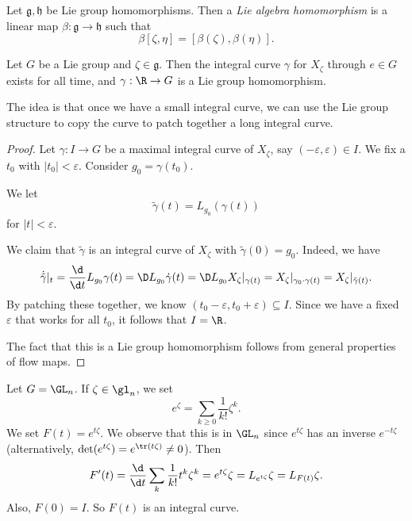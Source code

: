 \documentclass[a4paper]{article}
\begin{document}
\begin{defi}
  Let $\mathfrak{g}, \mathfrak{h}$ be Lie group homomorphisms. Then a \emph{Lie algebra homomorphism} is a linear map $\beta: \mathfrak{g} \to \mathfrak{h}$ such that
  \[
    \beta[\zeta,\eta] = [\beta(\zeta), \beta(\eta)].
  \]
\end{defi}

\begin{prop}
  Let $G$ be a Lie group and $\zeta \in \mathfrak{g}$. Then the integral curve $\gamma$ for $X_\zeta$ through $e \in G$ exists for all time, and $\gamma: \R \to G$ is a Lie group homomorphism.
\end{prop}

The idea is that once we have a small integral curve, we can use the Lie group structure to copy the curve to patch together a long integral curve.
\begin{proof}
  Let $\gamma: I \to G$ be a maximal integral curve of $X_\zeta$, say $(-\varepsilon, \varepsilon) \in I$. We fix a $t_0$ with $|t_0| < \varepsilon$. Consider $g_0 = \gamma(t_0)$.

  We let
  \[
    \tilde{\gamma}(t) = L_{g_0}(\gamma(t))
  \]
  for $|t| < \varepsilon$.

  We claim that $\tilde{\gamma}$ is an integral curve of $X_\zeta$ with $\tilde{\gamma}(0) = g_0$. Indeed, we have
  \[
    \dot{\tilde{\gamma}}|_t = \frac{\d}{\d t} L_{g_0}\gamma(t) = \D L_{g_0} \dot{\gamma}(t) = \D L_{g_0} X_\zeta|_{\gamma(t)} = X_\zeta|_{\gamma_0 \cdot \gamma(t)} = X_\zeta|_{\tilde{\gamma}(t)}.
  \]
  By patching these together, we know $(t_0 - \varepsilon, t_0 + \varepsilon) \subseteq I$. Since we have a fixed $\varepsilon$ that works for all $t_0$, it follows that $I = \R$.

  The fact that this is a Lie group homomorphism follows from general properties of flow maps.
\end{proof}

\begin{eg}
  Let $G = \GL_n$. If $\zeta \in \gl_n$, we set
  \[
    e^\zeta = \sum_{k \geq 0} \frac{1}{k!} \zeta^k.
  \]
  We set $F(t) = e^{t \zeta}$. We observe that this is in $\GL_n$ since $e^{t\zeta}$ has an inverse $e^{-t\zeta}$ (alternatively, $\det (e^{t\zeta}) = e^{\tr (t\zeta)} \not= 0$). Then
  \[
    F'(t) = \frac{\d}{\d t} \sum_k \frac{1}{k!} t^k \zeta^k = e^{t\zeta} \zeta = L_{e^{t\zeta}}\zeta = L_{F(t)}\zeta.
  \]
  Also, $F(0) = I$. So $F(t)$ is an integral curve.
\end{eg}
\end{document}
